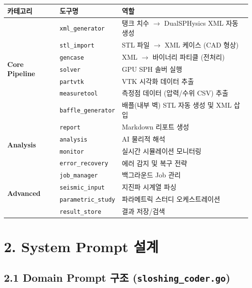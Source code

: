 \documentclass[10pt,a4paper]{article}
\begin{document}
\begin{center}
\small
\begin{tabular}{llp{8cm}}
\toprule
\textbf{카테고리} & \textbf{도구명} & \textbf{역할} \\
\midrule
\multirow{7}{*}{\textbf{Core Pipeline}} & \texttt{xml\_generator} & 탱크 치수 $\rightarrow$ DualSPHysics XML 자동 생성 \\
 & \texttt{stl\_import} & STL 파일 $\rightarrow$ XML 케이스 (CAD 형상) \\
 & \texttt{gencase} & XML $\rightarrow$ 바이너리 파티클 (전처리) \\
 & \texttt{solver} & GPU SPH 솔버 실행 \\
 & \texttt{partvtk} & VTK 시각화 데이터 추출 \\
 & \texttt{measuretool} & 측정점 데이터 (압력/수위 CSV) 추출 \\
 & \texttt{baffle\_generator} & 배플(내부 벽) STL 자동 생성 및 XML 삽입 \\
\midrule
\multirow{4}{*}{\textbf{Analysis}} & \texttt{report} & Markdown 리포트 생성 \\
 & \texttt{analysis} & AI 물리적 해석 \\
 & \texttt{monitor} & 실시간 시뮬레이션 모니터링 \\
 & \texttt{error\_recovery} & 에러 감지 및 복구 전략 \\
\midrule
\multirow{4}{*}{\textbf{Advanced}} & \texttt{job\_manager} & 백그라운드 Job 관리 \\
 & \texttt{seismic\_input} & 지진파 시계열 파싱 \\
 & \texttt{parametric\_study} & 파라메트릭 스터디 오케스트레이션 \\
 & \texttt{result\_store} & 결과 저장/검색 \\
\bottomrule
\end{tabular}
\end{center}

\section{2. System Prompt 설계}

\subsection{2.1 Domain Prompt 구조 (\texttt{sloshing\_coder.go})}
\end{document}
